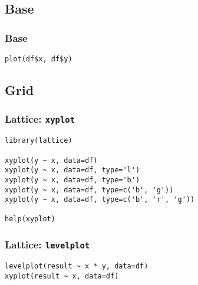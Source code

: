 \documentclass[bigger]{beamer}
\begin{document}
\subsection{Base}
\label{sec-5-1}
\begin{frame}[fragile]
\frametitle{Base}
\label{sec-5-1-1}


\lstset{language=R}
\begin{lstlisting}
plot(df$x, df$y)
\end{lstlisting}
\end{frame}
\subsection{Grid}
\label{sec-5-2}
\begin{frame}[fragile]
\frametitle{Lattice: \texttt{xyplot}}
\label{sec-5-2-1}


\lstset{language=R}
\begin{lstlisting}
library(lattice)

xyplot(y ~ x, data=df)
xyplot(y ~ x, data=df, type='l')
xyplot(y ~ x, data=df, type='b')
xyplot(y ~ x, data=df, type=c('b', 'g'))
xyplot(y ~ x, data=df, type=c('b', 'r', 'g'))

help(xyplot)
\end{lstlisting}
\end{frame}
\begin{frame}[fragile]
\frametitle{Lattice: \texttt{levelplot}}
\label{sec-5-2-2}


\lstset{language=R}
\begin{lstlisting}
levelplot(result ~ x * y, data=df)
xyplot(result ~ x, data=df)
\end{lstlisting}
\end{frame}
\end{document}
